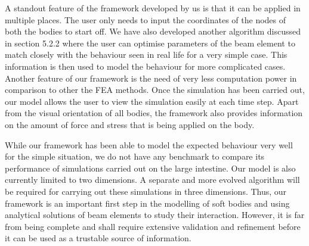 \documentclass[12pt]{report}
\begin{document}
A standout feature of the framework developed by us is that it can be applied in multiple places. The user only needs to input the coordinates of the nodes of both the bodies to start off. We have also developed another algorithm discussed in section 5.2.2 where the user can optimise parameters of the beam element to match closely with the behaviour seen in real life for a very simple case. This information is then used to model the behaviour for more complicated cases. Another feature of our framework is the need of very less computation power in comparison to other the FEA methods. Once the simulation has been carried out, our model allows the user to view the simulation easily at each time step. Apart from the visual orientation of all bodies, the framework also provides information on the amount of force and stress that is being applied on the body.\par

While our framework has been able to model the expected behaviour very well for the simple situation, we do not have any benchmark to compare its performance of simulations carried out on the large intestine. Our model is also currently limited to two dimensions. A separate and more evolved algorithm will be required for carrying out these simulations in three dimensions. Thus, our framework is an important first step in the modelling of soft bodies and using analytical solutions of beam elements to study their interaction. However, it is far from being complete and shall require extensive validation and refinement before it can be used as a trustable source of information.\par




\newpage

\vspace{\baselineskip}\printbibliography

\printbibliography
\end{document}
